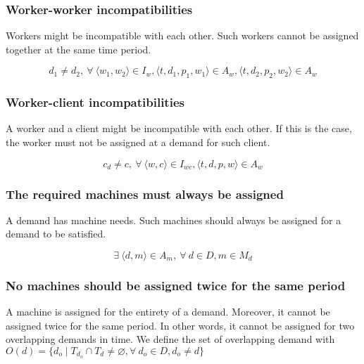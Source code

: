 \documentclass[../thesis.tex]{subfiles}
\begin{document}
\subsubsection{Worker-worker incompatibilities}

Workers might be incompatible with each other. Such workers cannot
be assigned together at the same time period.

\begin{equation*}
  d_1 \neq d_2, \ \forall \ \langle w_1, w_2\rangle \in I_w, \langle t, d_1, p_1, w_1\rangle \in A_w,  \langle t, d_2, p_2, w_2\rangle \in A_w
\end{equation*}


\subsubsection{Worker-client incompatibilities}

A worker and a client might be incompatible with each other. 
If this is the case, the worker must not be assigned at a demand for such client.


\begin{equation*}
  c_d \neq c, \ \forall \ \langle w, c \rangle \in I_{wc}, \langle t, d, p, w\rangle \in A_w
\end{equation*}


\subsubsection{The required machines must always be assigned}

A demand has machine needs. Such machines should always be assigned 
for a demand to be satisfied.

\begin{equation*}
  \exists \ \langle d, m \rangle \in A_m, \ \forall \ d \in D, m \in M_d
\end{equation*}

\subsubsection{No machines should be assigned twice for the same period}

A machine is assigned for the entirety of a demand. Moreover, it cannot be assigned twice 
for the same period. In other words, it cannot be assigned for two overlapping demands in time.
We define the set of overlapping demand with $O(d) = \{ d_o \mid T_{d_o} \cap T_d \neq \varnothing, \forall \ d_o \in D, d_o \neq d \}$
\end{document}
